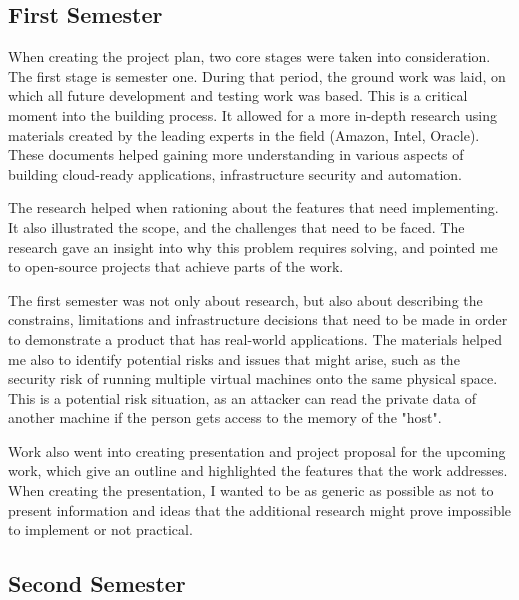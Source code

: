 \documentclass{article}
\begin{document}
\subsection{First Semester}
When creating the project plan, two core stages were taken into consideration. The first stage is semester one. During that period, the ground work was laid, on which all future development and testing work was based. This is a critical moment into the building process. It allowed for a more in-depth research using materials created by the leading experts in the field (Amazon, Intel, Oracle). These documents helped gaining more understanding in various aspects of building cloud-ready applications, infrastructure security and automation.

The research helped when rationing about the features that need implementing. It also illustrated the scope, and the challenges that need to be faced. The research gave an insight into why this problem requires solving, and pointed me to open-source projects that achieve parts of the work.

The first semester was not only about research, but also about describing the constrains, limitations and infrastructure decisions that need to be made in order to demonstrate a  product that has real-world applications.
The materials helped me also to identify potential risks and issues that might arise, such as the security risk of running multiple virtual machines onto the same physical space. This is a potential risk situation, as an attacker can read the private data of another machine if the person gets access to the memory of the "host".

Work also went into creating presentation and project proposal for the upcoming work, which give an outline and highlighted the features that the work addresses.
When creating the presentation, I wanted to be as generic as possible as not to present information and ideas that the additional research might prove impossible to implement or not practical.

\subsection{Second Semester}
\end{document}
